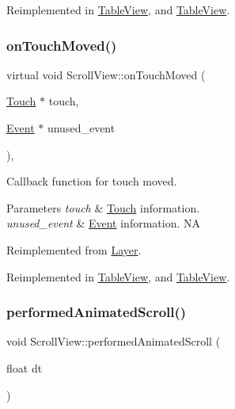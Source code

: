 Reimplemented in \hyperlink{classTableView_acd131e5fa29332743e625a1a0d047965}{Table\+View}, and \hyperlink{classTableView_a242e9d8c695681b41eef636471e768b5}{Table\+View}.

\mbox{\label{classScrollView_a8a0b3a876f644fbd941773e577c7b550}} 
\subsubsection{\texorpdfstring{on\+Touch\+Moved()}{onTouchMoved()}\hspace{0.1cm}{\footnotesize\ttfamily [2/2]}}
{\footnotesize\ttfamily virtual void Scroll\+View\+::on\+Touch\+Moved (\begin{DoxyParamCaption}\item[{\hyperlink{classTouch}{Touch} $\ast$}]{touch,  }\item[{\hyperlink{classEvent}{Event} $\ast$}]{unused\+\_\+event }\end{DoxyParamCaption})\hspace{0.3cm}{\ttfamily [override]}, {\ttfamily [virtual]}}

Callback function for touch moved.


\begin{DoxyParams}{Parameters}
{\em touch} & \hyperlink{classTouch}{Touch} information. \\
\hline
{\em unused\+\_\+event} & \hyperlink{classEvent}{Event} information.  NA \\
\hline
\end{DoxyParams}


Reimplemented from \hyperlink{classLayer_ad614a7a347f171cd6185e7aeef125047}{Layer}.



Reimplemented in \hyperlink{classTableView_acd131e5fa29332743e625a1a0d047965}{Table\+View}, and \hyperlink{classTableView_a242e9d8c695681b41eef636471e768b5}{Table\+View}.

\mbox{\label{classScrollView_ac3f32e65ea62a4322c37da1316ebc110}} 
\subsubsection{\texorpdfstring{performed\+Animated\+Scroll()}{performedAnimatedScroll()}\hspace{0.1cm}{\footnotesize\ttfamily [1/2]}}
{\footnotesize\ttfamily void Scroll\+View\+::performed\+Animated\+Scroll (\begin{DoxyParamCaption}\item[{float}]{dt }\end{DoxyParamCaption})\hspace{0.3cm}{\ttfamily [protected]}}

